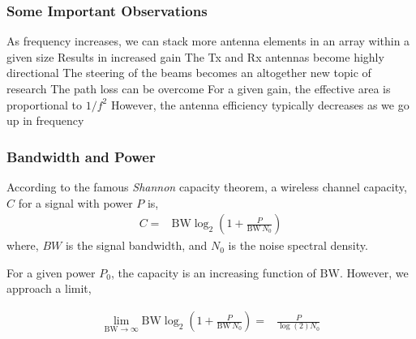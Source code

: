\documentclass[10pt]{beamer}
\begin{document}
\begin{frame}
    \frametitle{Some Important Observations}
    \begin{outline}
        \1 As frequency increases, we can stack more antenna elements in an array within a given size
        \2 Results in increased gain
        \1 The Tx and Rx antennas become highly directional
        \2 The steering of the beams becomes an altogether new topic of research
        \2 The path loss can be overcome
        \1 For a given gain, the effective area is proportional to $1/f^2$
        \1 However, the antenna efficiency typically decreases as we go up in frequency
    \end{outline}
\end{frame}


\begin{frame}
    \frametitle{Bandwidth and Power}

    According to the famous \textit{Shannon} capacity theorem, a wireless channel capacity, $C$ for a signal with power $P$ is,
    \begin{align*}
        C {}= & \text{BW} \log _{2}\left(1+\frac{P}{\text{BW} \, N_0}\right)
    \end{align*}
    where, $BW$ is the signal bandwidth, and $N_0$ is the noise spectral density.

    \begin{outline}
        \1 For a given power $P_0$, the capacity is an increasing function of $\text{BW}$.
        \1 However, we approach a limit,
    \end{outline}
    \begin{align*}
        \lim_{\text{BW} \rightarrow \infty} \text{BW} \log_{2}\left(1+\frac{P}{\text{BW} \,  N_{0}}\right) {}= & \frac{P}{\log (2) N_{0}}
    \end{align*}
\end{frame}
\end{document}
